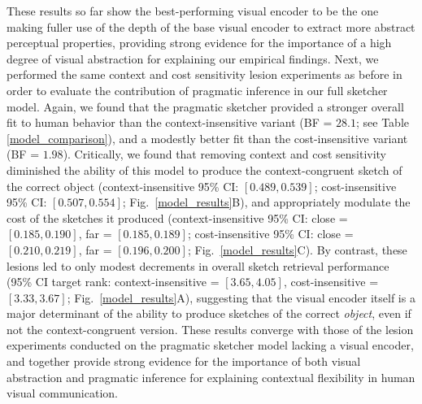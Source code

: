\documentclass{svjour3}
\begin{document}
These results so far show the best-performing visual encoder to be the one making fuller use of the depth of the base visual encoder to extract more abstract perceptual properties, providing strong evidence for the importance of a high degree of visual abstraction for explaining our empirical findings. 
Next, we performed the same context and cost sensitivity lesion experiments as before in order to evaluate the contribution of pragmatic inference in our full sketcher model. 
Again, we found that the pragmatic sketcher provided a stronger overall fit to human behavior than the context-insensitive variant (BF = $28.1$; see Table \ref{model_comparison}), and a modestly better fit than the cost-insensitive variant (BF = $1.98$). 
Critically, we found that removing context and cost sensitivity diminished the ability of this model to produce the context-congruent sketch of the correct object (context-insensitive 95\% CI: $[0.489, 0.539]$; cost-insensitive 95\% CI: $[0.507, 0.554]$; Fig.~\ref{model_results}B), and appropriately modulate the cost of the sketches it produced (context-insensitive 95\% CI: close = $[0.185, 0.190]$, far = $[0.185, 0.189]$; cost-insensitive 95\% CI: close = $[0.210, 0.219]$, far = $[0.196, 0.200]$; Fig.~\ref{model_results}C). 
By contrast, these lesions led to only modest decrements in overall sketch retrieval performance (95\% CI target rank: context-insensitive = $[3.65, 4.05]$, cost-insensitive = $[3.33, 3.67]$;  Fig.~\ref{model_results}A), suggesting that the visual encoder itself is a major determinant of the ability to produce sketches of the correct \textit{object}, even if not the context-congruent version.
These results converge with those of the lesion experiments conducted on the pragmatic sketcher model lacking a visual encoder, and together provide strong evidence for the importance of both visual abstraction and pragmatic inference for explaining contextual flexibility in human visual communication. 
\end{document}
